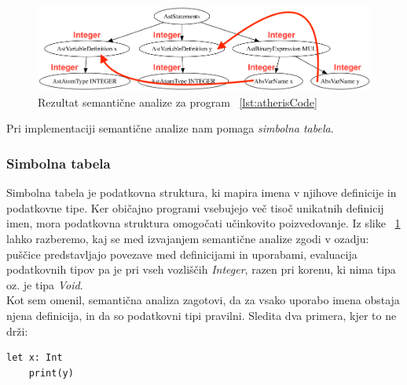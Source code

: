 \documentclass[a4paper, 12pt]{book}
\begin{document}
\begin{figure}[h]
	\begin{center}
		\includegraphics[width=1\textwidth]{resources/astSeman.png}
	\end{center}
	\caption{Rezultat semantične analize za program ~\ref{lst:atherisCode}}
	\label{image:astSeman}
\end{figure}

Pri implementaciji semantične analize nam pomaga \textit{simbolna tabela}.

\subsubsection{Simbolna tabela}

Simbolna tabela je podatkovna struktura, ki mapira imena v njihove definicije in podatkovne tipe. \cite{modernCompiler} Ker običajno programi vsebujejo več tisoč unikatnih definicij imen, mora podatkovna struktura omogočati učinkovito poizvedovanje. Iz slike ~\ref{image:astSeman} lahko razberemo, kaj se med izvajanjem semantične analize zgodi v ozadju: puščice predstavljajo povezave med definicijami in uporabami, evaluacija podatkovnih tipov pa je pri vseh vozliščih \textit{Integer}, razen pri korenu, ki nima tipa oz. je tipa \textit{Void}.\\
\indent Kot sem omenil, semantična analiza zagotovi, da za vsako uporabo imena obstaja njena definicija, in da so podatkovni tipi pravilni. Sledita dva primera, kjer to ne drži:

\begin{lstlisting}[caption={Primer programa, kjer spremenljivka \textit{y} ni definirana},label={lst:atherisCodeNameError},captionpos=b]
	let x: Int
	print(y)
\end{lstlisting}
\end{document}
